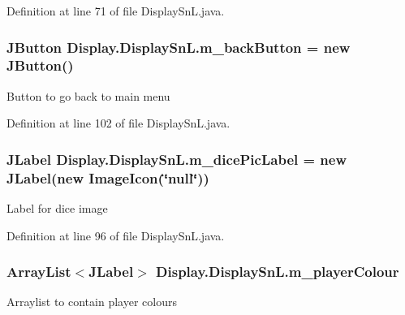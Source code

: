 Definition at line 71 of file Display\+Sn\+L.\+java.

\hypertarget{class_display_1_1_display_sn_l_a9452f0a663eaea507cf3561851e5c74e}{}
\subsubsection[{m\+\_\+back\+Button}]{\setlength{\rightskip}{0pt plus 5cm}J\+Button Display.\+Display\+Sn\+L.\+m\+\_\+back\+Button = new J\+Button()\hspace{0.3cm}{\ttfamily [private]}}\label{class_display_1_1_display_sn_l_a9452f0a663eaea507cf3561851e5c74e}
Button to go back to main menu 

Definition at line 102 of file Display\+Sn\+L.\+java.

\hypertarget{class_display_1_1_display_sn_l_aafb6d505956de58bbd229a789342ef19}{}
\subsubsection[{m\+\_\+dice\+Pic\+Label}]{\setlength{\rightskip}{0pt plus 5cm}J\+Label Display.\+Display\+Sn\+L.\+m\+\_\+dice\+Pic\+Label = new J\+Label(new Image\+Icon(\char`\"{}null\char`\"{}))\hspace{0.3cm}{\ttfamily [private]}}\label{class_display_1_1_display_sn_l_aafb6d505956de58bbd229a789342ef19}
Label for dice image 

Definition at line 96 of file Display\+Sn\+L.\+java.

\hypertarget{class_display_1_1_display_sn_l_a075a16b363ea3d1e75e589fe11b2b0e7}{}
\subsubsection[{m\+\_\+player\+Colour}]{\setlength{\rightskip}{0pt plus 5cm}Array\+List$<$J\+Label$>$ Display.\+Display\+Sn\+L.\+m\+\_\+player\+Colour\hspace{0.3cm}{\ttfamily [private]}}\label{class_display_1_1_display_sn_l_a075a16b363ea3d1e75e589fe11b2b0e7}
Arraylist to contain player colours 

